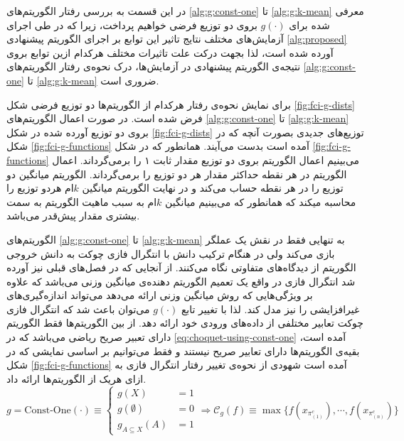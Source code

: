 در این قسمت به بررسی رفتار الگوریتم‌های \ref{alg:g:const-one} تا \ref{alg:g:k-mean} معرفی شده برای $g(\cdot)$ بروی دو توزیع فرضی خواهیم پرداخت، زیرا که در طی اجرای آزمایش‌های مختلف نتایج تاثیر این توابع بر اجرای الگوریتم پیشنهادی \ref{alg:proposed} آورده شده است، لذا بجهت درکت علت تاثیرات مختلف هرکدام ازین توابع بروی نتیجه‌ی الگوریتم پیشنهادی در آزمایش‌ها، درک نحوه‌ی رفتار الگوریتم‌های \ref{alg:g:const-one} تا \ref{alg:g:k-mean} ضروری است.

برای نمایش نحوه‌ی رفتار هرکدام از الگوریتم‌ها دو توزیع فرضی شکل \ref{fig:fci-g-dists} فرض شده است. در صورت اعمال الگوریتم‌های \ref{alg:g:const-one} تا \ref{alg:g:k-mean} بروی دو توزیع آورده شده در شکل \ref{fig:fci-g-dists} توزیع‌های جدیدی بصورت آنچه که در شکل \ref{fig:fci-g-functions} آمده است بدست می‌آیند. همانطور که در شکل \ref{fig:fci-g-functions} می‌بینیم اعمال الگوریتم  بروی دو توزیع مقدار ثابت ۱ را برمی‌گرداند. اعمال الگوریتم  در هر نقطه حداکثر مقدار هر دو توزیع را برمی‌گرداند. الگوریتم  میانگین دو توزیع را در هر نقطه حساب می‌کند و در نهایت الگوریتم  میانگین $k$ام هردو توزیع را محاسبه میکند که همانطور که می‌بینیم میانگین $k$ام به سبب ماهیت الگوریتم به سمت بیشتری مقدار پیش‌قدر می‌باشد.


الگوریتم‌های \ref{alg:g:const-one} تا \ref{alg:g:k-mean} به تنهایی فقط در نقش یک عملگر بازی می‌کند ولی در هنگام ترکیب دانش با انتگرال فازی چوکت به دانش خروجی الگوریتم از دیدگاه‌های متفاوتی نگاه می‌کنند. از آنجایی که در فصل‌های قبلی نیز آورده شد انتگرال فازی در واقع یک تعمیم الگوریتم دهنده‌ی میانگین وزنی می‌باشد که علاوه بر ویژگی‌هایی که روش میانگین وزنی ارائه می‌دهد می‌تواند اندازه‌گیری‌های غیرافزایشی را نیز مدل کند. لذا با تغییر تابع $g(\cdot)$ می‌توان باعث شد که انتگرال فازی چوکت تعابیر مختلفی از داده‌های ورودی خود ارائه دهد. از بین الگوریتم‌ها فقط الگوریتم  دارای تعبیر صریح ریاضی می‌باشد که در
\ref{eq:choquet-using-const-one}
آمده است، بقیه‌ی الگوریتم‌ها دارای تعابیر صریح نیستند و فقط می‌توانیم بر اساسی نمایشی که در شکل \ref{fig:fci-g-functions} آمده است شهودی از نحوه‌ی تغییر رفتار انتگرال فازی به ازای هریک از الگوریتم‌ها ارائه داد.
\begin{equation}
g = \text{Const-One}(\cdot) \equiv \begin{cases}
g(X) &= 1\\
g(\emptyset) &= 0\\
g_{A \subseteq X}(A) &= 1
\end{cases} \Rightarrow \mathcal{C}_g(f) \equiv \max\{f(x_{\pi^c_{(1)}}), \cdots, f(x_{\pi^c_{(n)}})\}\label{eq:choquet-using-const-one}
\end{equation}